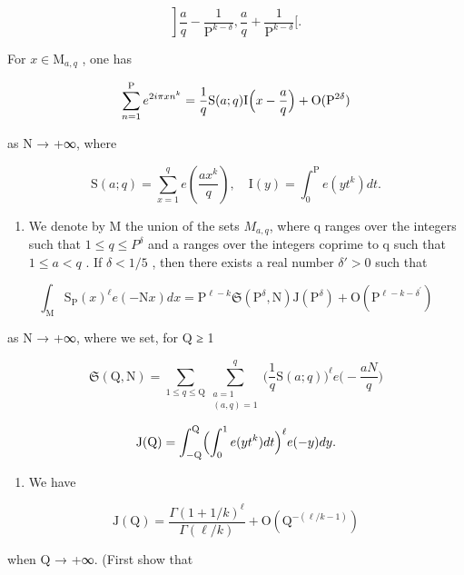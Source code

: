 \[
\left. \right] \frac {a}{q} - \frac {1}{\mathrm{P} ^ {k - \delta}}, \frac {a}{q} + \frac {1}{\mathrm{P} ^ {k - \delta}} \Big [.
\]

For \(x\in \mathrm{M}_{a,q}\) , one has

\[
\sum_ {n = 1} ^ {\mathrm{P}} e ^ {2 i \pi x n ^ {k}} = \frac {1}{q} \mathrm{S} (a; q) \mathrm{I} \Bigl (x - \frac {a}{q} \Bigr) + \mathrm{O} (\mathrm{P} ^ {2 \delta})
\]

as N → +∞, where

\[
\mathrm{S} (a; q) = \sum_ {x = 1} ^ {q} e \left(\frac {a x ^ {k}}{q}\right), \quad \mathrm{I} (y) = \int_ {0} ^ {\mathrm{P}} e \left(y t ^ {k}\right) d t.
\]

\begin{enumerate}
\def\labelenumi{\alph{enumi})}
\setcounter{enumi}{2}
\tightlist
\item
  We denote by M the union of the sets \(M_{a,q}\), where q ranges over the integers such that \(1 \leqslant q \leqslant P^{\delta}\) and a ranges over the integers coprime to q such that \(1 \leqslant a < q\) . If \(\delta < 1/5\) , then there exists a real number \(\delta' > 0\) such that
\end{enumerate}

\[
\int_ {\mathrm{M}} \mathrm{S} _ {\mathrm{P}} (x) ^ {\ell} e (- \mathrm{N} x) d x = \mathrm{P} ^ {\ell - k} \mathfrak {S} (\mathrm{P} ^ {\delta}, \mathrm{N}) \mathrm{J} (\mathrm{P} ^ {\delta}) + \mathrm{O} (\mathrm{P} ^ {\ell - k - \delta^ {\prime}})
\]

as N → +∞, where we set, for Q ≥ 1

\[
\mathfrak{S}(\mathrm{Q},\mathrm{N}) = \sum_{1\leqslant q\leqslant \mathrm{Q}}\sum_{\substack{a = 1\\ (a,q) = 1}}^{q}\Big(\frac{1}{q}\mathrm{S}(a;q)\Big)^{\ell}e\Big(-\frac{aN}{q}\Big)
\]

\[
\mathrm{J(Q)} = \int_ {- \mathrm{Q}} ^ {\mathrm{Q}} \Bigl (\int_ {0} ^ {1} e (y t ^ {k}) d t \Bigr) ^ {\ell} e (- y) d y.
\]

\begin{enumerate}
\def\labelenumi{\alph{enumi})}
\setcounter{enumi}{3}
\tightlist
\item
  We have
\end{enumerate}

\[
\mathrm{J} (\mathrm{Q}) = \frac {\Gamma (1 + 1 / k) ^ {\ell}}{\Gamma (\ell / k)} + \mathrm{O} (\mathrm{Q} ^ {- (\ell / k - 1)})
\]

when Q → +∞. (First show that

